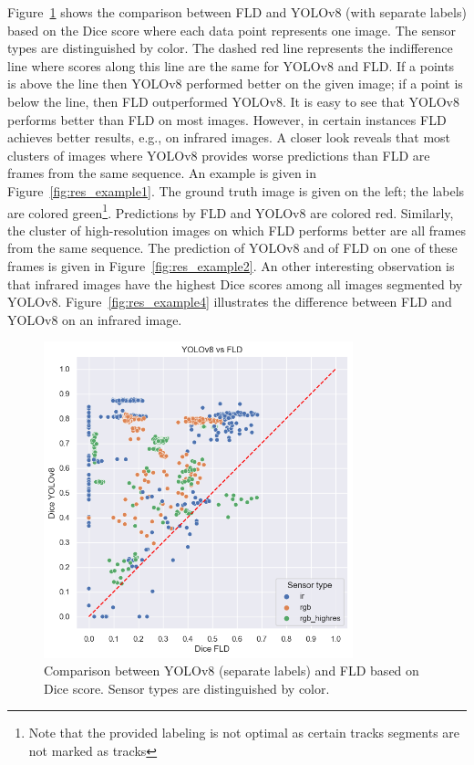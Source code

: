 \documentclass[Master,MDS,english]{BASE/twbook} %
\begin{document}
Figure~\ref{fig:yolo_vs_fld} shows the comparison between FLD and YOLOv8 (with separate labels) based on the Dice score where each data point represents one image. The sensor types are distinguished by color. The dashed red line represents the indifference line where scores along this line are the same for YOLOv8 and FLD. If a points is above the line then YOLOv8 performed better on the given image; if a point is below the line, then FLD outperformed YOLOv8. It is easy to see that YOLOv8 performs better than FLD on most images. However, in certain instances FLD achieves better results, e.g., on infrared images. A closer look reveals that most clusters of images where YOLOv8 provides worse predictions than FLD are frames from the same sequence. 
An example is given in Figure~\ref{fig:res_example1}. The ground truth image is given on the left; the labels are colored green\footnote{Note that the provided labeling is not optimal as certain tracks segments are not marked as tracks}. Predictions by FLD and YOLOv8 are colored red. 
Similarly, the cluster of high-resolution images on which FLD performs better are all frames from the same sequence. The prediction of YOLOv8 and of FLD on one of these frames is given in Figure~\ref{fig:res_example2}.
An other interesting observation is that infrared images have the highest Dice scores among all images segmented by YOLOv8. Figure~\ref{fig:res_example4} illustrates the difference between FLD and YOLOv8 on an infrared image.



\begin{figure}[h]
\centering
\includegraphics[width=0.8\textwidth]{images/results/dice_fld_vs_yolo_nl}
\caption{Comparison between YOLOv8 (separate labels) and FLD based on Dice score. Sensor types are distinguished by color. }
\label{fig:yolo_vs_fld}
\end{figure}
\end{document}
